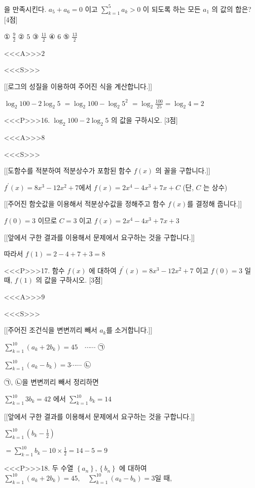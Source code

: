 \documentclass{oblivoir}
\begin{document}
을 만족시킨다. $a_{5}+a_{6}=0$ 이고 $\sum_{k=1}^{5} a_{k}>0$ 이 되도록 하는 모든 $a_{1}$ 의 값의 합은? [4점]

① $\frac{9}{2}$
② $5$
③ $\frac{11}{2}$
④ $6$
⑤ $\frac{13}{2}$

<<<A>>>$2$

<<<S>>>

[[로그의 성질을 이용하여 주어진 식을 계산합니다.]]

$ \log _{2} 100-2 \log _{2} 5$ $=\log _{2} 100-\log _{2} 5^{2}$
$=\log _{2} \frac{100}{25}=\log _{2} 4=2 $


<<<P>>>16. $\log _{2} 100-2 \log _{2} 5$ 의 값을 구하시오. [3점]

<<<A>>>$8$

<<<S>>>

[[도함수를 적분하여 적분상수가 포함된 함수 $f(x)$ 의 꼴을 구합니다.]]

$f^{\prime}(x)=8 x^{3}-12 x^{2}+7$에서
$f(x)=2 x^{4}-4 x^{3}+7 x+C $ (단, $C$ 는 상수)

[[주어진 함숫값을 이용해서 적분상수값을 정해주고 함수 $f(x)$를 결정해 줍니다.]]

$ f(0)=3 $ 이므로 $C=3 $ 이고 $ f(x)=2 x^{4}-4 x^{3}+7 x+3$ 

[[앞에서 구한 결과를 이용해서 문제에서 요구하는 것을 구합니다.]]

따라서 $f(1)=2-4+7+3=8$


<<<P>>>17. 함수 $f(x)$ 에 대하여 $f^{\prime}(x)=8 x^{3}-12 x^{2}+7$ 이고 $f(0)=3$ 일 때, $f(1)$ 의 값을 구하시오. [3점]

<<<A>>>$9$

<<<S>>>

[[주어진 조건식을 변변끼리 빼서 $a_{k}$를 소거합니다.]]

$ \sum_{k=1}^{10}\left(a_{k}+2 b_{k}\right)=45 \quad \cdots \cdots$ ㉠

$\sum_{k=1}^{10}\left(a_{k}-b_{k}\right)=3 \cdots \cdots$ ㉡

㉠, ㉡을 변변끼리 빼서 정리하면

$\sum_{k=1}^{10} 3 b_{k}=42$ 에서 $\sum_{k=1}^{10} b_{k}=14$

[[앞에서 구한 결과를 이용해서 문제에서 요구하는 것을 구합니다.]]

$ \sum_{k=1}^{10}\left(b_{k}-\frac{1}{2}\right) $

$=\sum_{k=1}^{10} b_{k}-10 \times \frac{1}{2}=14-5=9 $

<<<P>>>18. 두 수열 $\left\{a_{n}\right\},\left\{b_{n}\right\}$ 에 대하여 $\sum_{k=1}^{10}\left(a_{k}+2 b_{k}\right)=45, \quad \sum_{k=1}^{10}\left(a_{k}-b_{k}\right)=3$일 때,
\end{document}
